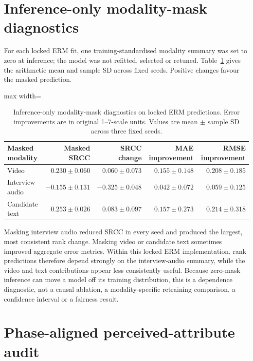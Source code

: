\section{Inference-only modality-mask diagnostics}

For each locked ERM fit, one training-standardised modality summary was set to zero at inference;
the model was not refitted, selected or retuned. Table~\ref{tab:stage-a-masks} gives the arithmetic
mean and sample SD across fixed seeds. Positive changes favour the masked prediction.

\begin{table}[htbp]
\centering
\caption{Inference-only modality-mask diagnostics on locked ERM predictions. Error improvements
are in original 1--7-scale units. Values are mean $\pm$ sample SD across three fixed seeds.}
\label{tab:stage-a-masks}
\small
\begin{adjustbox}{max width=\textwidth}
\begin{tabular}{lrrrr}
\toprule
Masked modality & Masked SRCC & SRCC change & MAE improvement & RMSE improvement \\
\midrule
Video & $0.230\pm0.060$ & $0.060\pm0.073$ & $0.155\pm0.148$ & $0.208\pm0.185$ \\
Interview audio & $-0.155\pm0.131$ & $-0.325\pm0.048$ & $0.042\pm0.072$ & $0.059\pm0.125$ \\
Candidate text & $0.253\pm0.026$ & $0.083\pm0.097$ & $0.157\pm0.273$ & $0.214\pm0.318$ \\
\bottomrule
\end{tabular}
\end{adjustbox}
\end{table}
\FloatBarrier

Masking interview audio reduced SRCC in every seed and produced the largest, most consistent rank
change. Masking video or candidate text sometimes improved aggregate error metrics. Within this
locked ERM implementation, rank predictions therefore depend strongly on the interview-audio
summary, while the video and text contributions appear less consistently useful. Because zero-mask
inference can move a model off its training distribution, this is a dependence diagnostic, not a
causal ablation, a modality-specific retraining comparison, a confidence interval or a fairness
result.

\section{Phase-aligned perceived-attribute audit}

